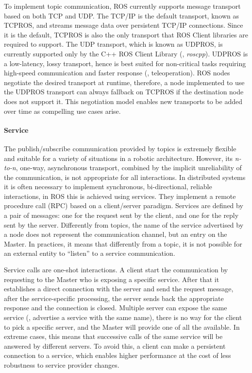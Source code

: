 To implement topic communication, ROS currently supports message transport based on both TCP and UDP. The TCP/IP is the default transport, known as TCPROS, and streams message data over persistent TCP/IP connections. Since it is the default, TCPROS is also the only transport that ROS Client libraries are required to support. The UDP transport, which is known as UDPROS, is currently supported only by the C++ ROS Client Library (\ie, \textit{roscpp}). UDPROS is a low-latency, lossy transport, hence is best suited for non-critical tasks requiring high-speed communication and faster response (\eg, teleoperation). ROS nodes negotiate the desired transport at runtime, therefore, a node implemented to use the UDPROS transport can always fallback on TCPROS if the destination node does not support it. This negotiation model enables new transports to be added over time as compelling use cases arise. 

\paragraph{Service} The publish/subscribe communication provided by topics is extremely flexible and suitable for a variety of situations in a robotic architecture. However, its \textit{n-to-n}, one-way, asynchronous transport, combined by the implicit unreliability of the communication, is not appropriate for all interactions. In distributed systems it is often necessary to implement synchronous, bi-directional, reliable interactions, in ROS this is achieved using services. They implement a remote procedure call (RPC) based on a client/server paradigm. Services are defined by a pair of messages: one for the request sent by the client, and one for the reply sent by the server. Differently from topics, the name of the service advertised by a node does not represent the communication channel, but an entry on the Master. In practices, it means that differently from a topic, it is not possible for an external entity to ``listen'' to a service communication.

Service calls are one-shot interactions. A client start the communication by requesting to the Master who is exposing a specific service. After that it establishes a direct connection with the server and send the request message, after the service-specific processing, the server sends back the appropriate response and the connection is closed. Multiple server can expose the same service (\ie, advertise a service with the same name), there is no way for the client to pick a specific server, and the Master will provide one of all the available. In extreme cases, this means that successive calls of the same service will be answered by different servers. To avoid this, a client can make a persistent connection to a service, which enables higher performance at the cost of less robustness to service provider changes.


